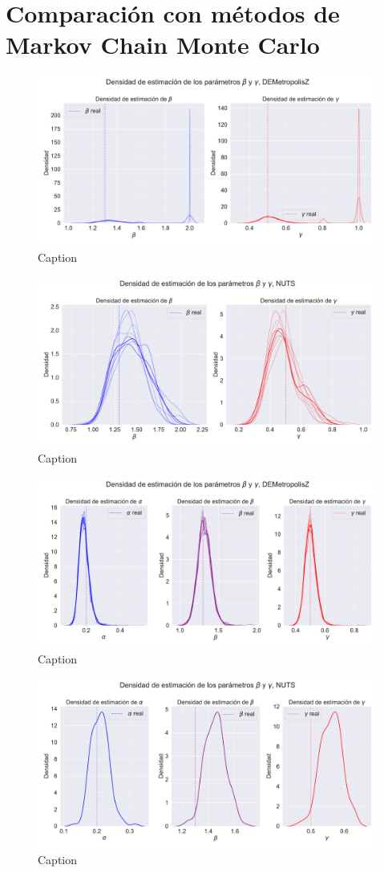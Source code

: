 \section{Comparación con métodos de Markov Chain Monte Carlo}

\begin{figure}[h]
    \centering
    \includegraphics[width=0.8\linewidth]{img/content/chapter4/DEMetropolis_sir_params_density.pdf}
    \caption{Caption}
    \label{fig:enter-label}
\end{figure}

\begin{figure}[h]
    \centering
    \includegraphics[width=0.8\linewidth]{img/content/chapter4/NUTS_sir_params_density.pdf}
    \caption{Caption}
    \label{fig:enter-label}
\end{figure}

\begin{figure}[h]
    \centering
    \includegraphics[width=0.8\linewidth]{img/content/chapter4/DEMetropolis_sir_rec_params_density.pdf}
    \caption{Caption}
    \label{fig:enter-label}
\end{figure}

\begin{figure}[h]
    \centering
    \includegraphics[width=0.8\linewidth]{img/content/chapter4/NUTS_sir_rec_params_density.pdf}
    \caption{Caption}
    \label{fig:enter-label}
\end{figure}

